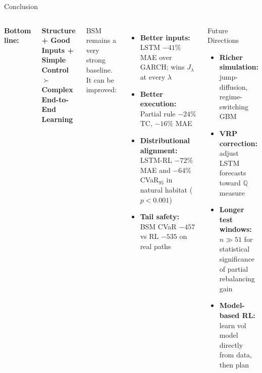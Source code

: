 \documentclass[aspectratio=169,10pt]{beamer}
\begin{document}
\begin{frame}{Conclusion}
\begin{columns}[T]
\textbf{Bottom line:}

\begin{center}
\Large
\textbf{Structure + Good Inputs + Simple Control}\\[0.3em]
$\succ$\\[0.3em]
\textbf{Complex End-to-End Learning}
\end{center}
BSM remains a very strong baseline. It can be improved:
\begin{itemize}
  \item \textbf{Better inputs:} LSTM $-41\%$ MAE over GARCH; wins $J_\lambda$ at every $\lambda$
  \item \textbf{Better execution:} Partial rule $-24\%$ TC, $-16\%$ MAE
  \item \textbf{Distributional alignment:} LSTM-RL $-72\%$ MAE and $-64\%$ CVaR$_{95}$ in natural habitat ($p<0.001$)
  \item \textbf{Tail safety:} BSM CVaR $-457$ vs RL $-535$ on real paths
\end{itemize}

\begin{block}{Future Directions}
\begin{itemize}\itemsep4pt
  \item \textbf{Richer simulation:} jump-diffusion, regime-switching GBM
  \item \textbf{VRP correction:} adjust LSTM forecasts toward $\mathbb{Q}$ measure
  \item \textbf{Longer test windows:} $n\gg51$ for statistical significance of partial rebalancing gain
  \item \textbf{Model-based RL:} learn vol model directly from data, then plan
\end{itemize}
\end{block}
\end{columns}
\end{frame}
\end{document}
